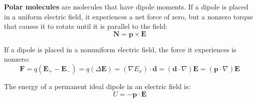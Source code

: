 \documentclass{article}
\begin{document}
\textbf{Polar molecules} are molecules that have dipole moments. If a dipole is placed in a uniform electric field, 
it experiences a net force of zero, but a nonzero torque that causes it to rotate until it is parallel to the field:
\[
    \mathbf{N}=\mathbf{p} \times \mathbf{E} 
\]

If a dipole is placed in a nonuniform electric field, the force it experiences is nonzero:
\[
    \mathbf{F}=q(\mathbf{E}_+-\mathbf{E}_-)=q(\Delta \mathbf{E} )=(\nabla E_x)\cdot \mathbf{d} =(\mathbf{d} \cdot \nabla)\mathbf{E}=(\mathbf{p} \cdot \nabla)\mathbf{E}  
\]

The energy of a permanent ideal dipole in an electric field is:
\[
    U=-\mathbf{p} \cdot \mathbf{E} 
\]
\end{document}
